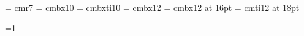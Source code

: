 
%



\font\small = cmr7
\font\sxmplbx = cmbx10 
\font\sxmplbxti = cmbxti10 
\font\xmplbx = cmbx12 %
\font\mxmplbx = cmbx12 at 16pt
\font\bxmplbx = cmti12 at 18pt %

\def\title#1{%
{\bxmplbx {\centerline {#1}}}
\vskip .2in
  {\leftskip = 2.5in%
  \par\noindent\llap{\hbox to 2.5in{\hfil {\bf Author:} }}{\it R. Scott
  McIntire}\par\noindent {\it Financial Engineering}%
  }%
\vskip .1in
 {\leftskip = 2.5in%
  \par\noindent\llap{\hbox to 2.5in{\hfil {\bf Date:} }} \date \par%
  }%
\vskip .25in
\hrule height 1pt
\vskip .1in
}

\def\section#1{\vskip .5in \centerline{\mxmplbx #1} \bigskip}

\def\subsection#1{\vskip .25 in \leftline{\xmplbx #1} \medskip}

=1
\def\chapter#1{%
\vfil
\supereject
{\bxmplbx {\centerline {Chapter \number\count3: #1}}}
\vskip .2in
\hrule height 1pt
\vskip .2in
\ifnum \count3 = 1 \pageno=1 \fi
\global\advance\count3 by 1
}%

\def\appendix#1{%
\vfil
\supereject
\section{#1}
}%

\def\titledate#1#2{%
{\bxmplbx {\centerline {#1}}}
\vskip .2in
  {\leftskip = 2.5in%
  \par\noindent\llap{\hbox to 2.5in{\hfil {\bf Author:} }}{\it R. Scott
  McIntire}\par\noindent
  }%
\vskip .1in
 {\leftskip = 2.5in%
  \par\noindent\llap{\hbox to 2.5in{\hfil {\bf Date:} }}#2 \par%
  }%
\vskip .25in
\hrule height 1pt
\vskip .1in
}


